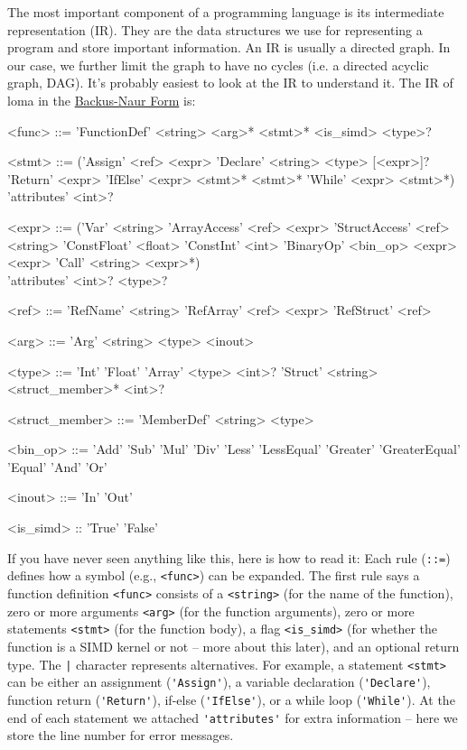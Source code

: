 The most important component of a programming language is its intermediate representation (IR). They are the data structures we use for representing a program and store important information. An IR is usually a directed graph. In our case, we further limit the graph to have no cycles (i.e. a directed acyclic graph, DAG). It's probably easiest to look at the IR to understand it. 
The IR of loma in the \href{https://en.wikipedia.org/wiki/Backus%E2%80%93Naur_form}{Backus-Naur Form} is:
\begin{grammar}
<func> ::= 'FunctionDef' <string> <arg>* <stmt>* <is_simd> <type>?

<stmt> ::= ('Assign' <ref> <expr>
\alt 'Declare' <string> <type> [<expr>]? 
\alt 'Return' <expr>
\alt 'IfElse' <expr> <stmt>* <stmt>*
\alt 'While' <expr> <stmt>*) \\
'attributes' <int>?

<expr> ::= ('Var' <string>
\alt 'ArrayAccess' <ref> <expr>
\alt 'StructAccess' <ref> <string>
\alt 'ConstFloat' <float>
\alt 'ConstInt' <int>
\alt 'BinaryOp' <bin_op> <expr> <expr>
\alt 'Call' <string> <expr>*) \\
'attributes' <int>? <type>?

<ref> ::= 'RefName' <string>
\alt 'RefArray' <ref> <expr>
\alt 'RefStruct' <ref> 

<arg> ::= 'Arg' <string> <type> <inout>

<type> ::= 'Int'
\alt 'Float'
\alt 'Array' <type> <int>?
\alt 'Struct' <string> <struct_member>* <int>?

<struct_member> ::= 'MemberDef' <string> <type>

<bin_op> ::= 'Add'
\alt 'Sub'
\alt 'Mul'
\alt 'Div'
\alt 'Less'
\alt 'LessEqual'
\alt 'Greater'
\alt 'GreaterEqual'
\alt 'Equal'
\alt 'And'
\alt 'Or'

<inout> ::= 'In' \alt 'Out'

<is_simd> :: 'True' \alt 'False'
\end{grammar}

If you have never seen anything like this, here is how to read it:
Each rule (\lstinline{::=}) defines how a symbol (e.g., \lstinline{<func>}) can be expanded. The first rule says a function definition \lstinline{<func>} consists of a \lstinline{<string>} (for the name of the function), zero or more arguments \lstinline{<arg>} (for the function arguments), zero or more statements \lstinline{<stmt>} (for the function body), a flag \lstinline{<is_simd>} (for whether the function is a SIMD kernel or not -- more about this later), and an optional return type. The \lstinline{|} character represents alternatives. For example, a statement \lstinline{<stmt>} can be either an assignment (\lstinline{'Assign'}), a variable declaration (\lstinline{'Declare'}), function return (\lstinline{'Return'}), if-else (\lstinline{'IfElse'}), or a while loop (\lstinline{'While'}). At the end of each statement we attached \lstinline{'attributes'} for extra information -- here we store the line number for error messages.

